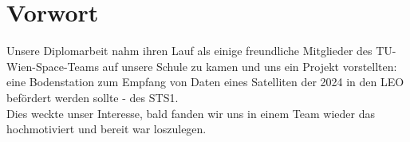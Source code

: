 \chapter*{Vorwort}
\label{chap:Vorwort}
Unsere Diplomarbeit nahm ihren Lauf als einige freundliche Mitglieder des TU-Wien-Space-Teams auf unsere Schule zu kamen und uns ein Projekt vorstellten: eine Bodenstation zum Empfang von Daten eines Satelliten der 2024 in den LEO befördert werden sollte - des STS1.\\
\newline
Dies weckte unser Interesse, bald fanden wir uns in einem Team wieder das hochmotiviert und bereit war loszulegen. 
